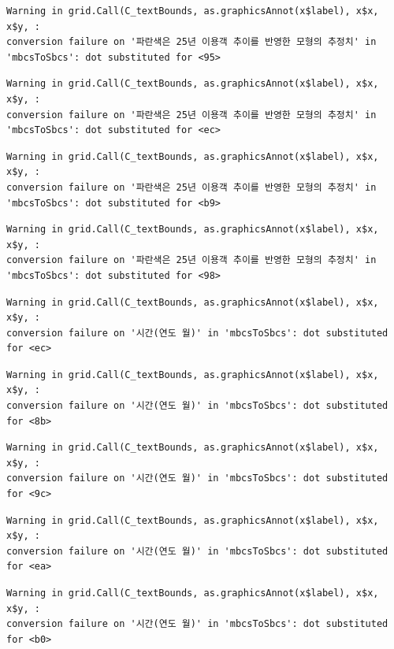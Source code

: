 \documentclass[
  letterpaper,
  DIV=11,
  numbers=noendperiod]{scrreprt}
\begin{document}
\begin{verbatim}
Warning in grid.Call(C_textBounds, as.graphicsAnnot(x$label), x$x, x$y, :
conversion failure on '파란색은 25년 이용객 추이를 반영한 모형의 추정치' in
'mbcsToSbcs': dot substituted for <95>
\end{verbatim}

\begin{verbatim}
Warning in grid.Call(C_textBounds, as.graphicsAnnot(x$label), x$x, x$y, :
conversion failure on '파란색은 25년 이용객 추이를 반영한 모형의 추정치' in
'mbcsToSbcs': dot substituted for <ec>
\end{verbatim}

\begin{verbatim}
Warning in grid.Call(C_textBounds, as.graphicsAnnot(x$label), x$x, x$y, :
conversion failure on '파란색은 25년 이용객 추이를 반영한 모형의 추정치' in
'mbcsToSbcs': dot substituted for <b9>
\end{verbatim}

\begin{verbatim}
Warning in grid.Call(C_textBounds, as.graphicsAnnot(x$label), x$x, x$y, :
conversion failure on '파란색은 25년 이용객 추이를 반영한 모형의 추정치' in
'mbcsToSbcs': dot substituted for <98>
\end{verbatim}

\begin{verbatim}
Warning in grid.Call(C_textBounds, as.graphicsAnnot(x$label), x$x, x$y, :
conversion failure on '시간(연도 월)' in 'mbcsToSbcs': dot substituted for <ec>
\end{verbatim}

\begin{verbatim}
Warning in grid.Call(C_textBounds, as.graphicsAnnot(x$label), x$x, x$y, :
conversion failure on '시간(연도 월)' in 'mbcsToSbcs': dot substituted for <8b>
\end{verbatim}

\begin{verbatim}
Warning in grid.Call(C_textBounds, as.graphicsAnnot(x$label), x$x, x$y, :
conversion failure on '시간(연도 월)' in 'mbcsToSbcs': dot substituted for <9c>
\end{verbatim}

\begin{verbatim}
Warning in grid.Call(C_textBounds, as.graphicsAnnot(x$label), x$x, x$y, :
conversion failure on '시간(연도 월)' in 'mbcsToSbcs': dot substituted for <ea>
\end{verbatim}

\begin{verbatim}
Warning in grid.Call(C_textBounds, as.graphicsAnnot(x$label), x$x, x$y, :
conversion failure on '시간(연도 월)' in 'mbcsToSbcs': dot substituted for <b0>
\end{verbatim}
\end{document}
